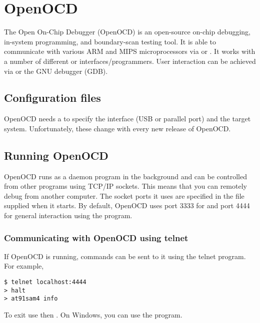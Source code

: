 \chapter{OpenOCD}
\label{OpenOCD}

The Open On-Chip Debugger (OpenOCD) is an open-source on-chip
debugging, in-system programming, and boundary-scan testing tool. It
is able to communicate with various ARM and MIPS microprocessors via
 or . It works with a number of
different  or 
interfaces/programmers. User interaction can be achieved via
 or the GNU debugger (GDB).


\section{Configuration files}
\label{configuration-files}

OpenOCD needs a  to
specify the interface (USB or parallel port) and the target system.
Unfortunately, these change with every new release of OpenOCD.


\section{Running OpenOCD}
\label{running-openocd}

OpenOCD runs as a daemon program in the background and can be
controlled from other programs using TCP/IP sockets. This means that
you can remotely debug from another computer. The socket ports it uses
are specified in the  file supplied when it starts. By default, OpenOCD
uses port 3333 for  and port 4444 for general
interaction using the  program.


\subsection{Communicating with OpenOCD using telnet}
\label{communicating-with-openocd-using-telnet}

If OpenOCD is running, commands can be sent to it using the telnet
program.  For example,
%
\begin{verbatim}
$ telnet localhost:4444
> halt
> at91sam4 info
\end{verbatim}
%
To exit use \code{ctrl-]} then .  On Windows, you can use the
   program.


